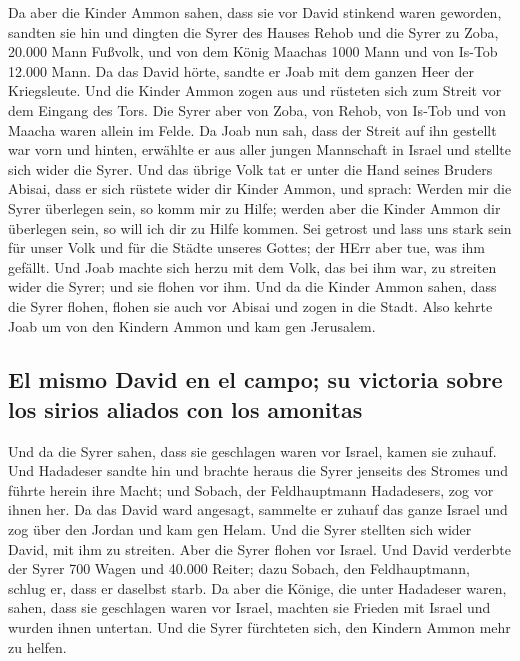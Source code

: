  Da aber die Kinder Ammon sahen, dass sie vor David
stinkend waren geworden, sandten sie hin und dingten die Syrer des
Hauses Rehob und die Syrer zu Zoba, 20.000 Mann Fußvolk, und von dem
König Maachas 1000 Mann und von Is-Tob 12.000 Mann.  Da
das David hörte, sandte er Joab mit dem ganzen Heer der Kriegsleute.
 Und die Kinder Ammon zogen aus und rüsteten sich zum
Streit vor dem Eingang des Tors. Die Syrer aber von Zoba, von Rehob, von
Is-Tob und von Maacha waren allein im Felde.  Da Joab nun
sah, dass der Streit auf ihn gestellt war vorn und hinten, erwählte er
aus aller jungen Mannschaft in Israel und stellte sich wider die Syrer.
 Und das übrige Volk tat er unter die Hand seines Bruders
Abisai, dass er sich rüstete wider dir Kinder Ammon,  und
sprach: Werden mir die Syrer überlegen sein, so komm mir zu Hilfe;
werden aber die Kinder Ammon dir überlegen sein, so will ich dir zu
Hilfe kommen.  Sei getrost und lass uns stark sein für
unser Volk und für die Städte unseres Gottes; der HErr aber tue, was ihm
gefällt.  Und Joab machte sich herzu mit dem Volk, das
bei ihm war, zu streiten wider die Syrer; und sie flohen vor ihm.
 Und da die Kinder Ammon sahen, dass die Syrer flohen,
flohen sie auch vor Abisai und zogen in die Stadt. Also kehrte Joab um
von den Kindern Ammon und kam gen Jerusalem.

\hypertarget{el-mismo-david-en-el-campo-su-victoria-sobre-los-sirios-aliados-con-los-amonitas}{%
\subsection{El mismo David en el campo; su victoria sobre los sirios
aliados con los
amonitas}\label{el-mismo-david-en-el-campo-su-victoria-sobre-los-sirios-aliados-con-los-amonitas}}

 Und da die Syrer sahen, dass sie geschlagen waren vor
Israel, kamen sie zuhauf.  Und Hadadeser sandte hin und
brachte heraus die Syrer jenseits des Stromes und führte herein ihre
Macht; und Sobach, der Feldhauptmann Hadadesers, zog vor ihnen her.
 Da das David ward angesagt, sammelte er zuhauf das ganze
Israel und zog über den Jordan und kam gen Helam. Und die Syrer stellten
sich wider David, mit ihm zu streiten.  Aber die Syrer
flohen vor Israel. Und David verderbte der Syrer 700 Wagen und 40.000
Reiter; dazu Sobach, den Feldhauptmann, schlug er, dass er daselbst
starb.  Da aber die Könige, die unter Hadadeser waren,
sahen, dass sie geschlagen waren vor Israel, machten sie Frieden mit
Israel und wurden ihnen untertan. Und die Syrer fürchteten sich, den
Kindern Ammon mehr zu helfen.

